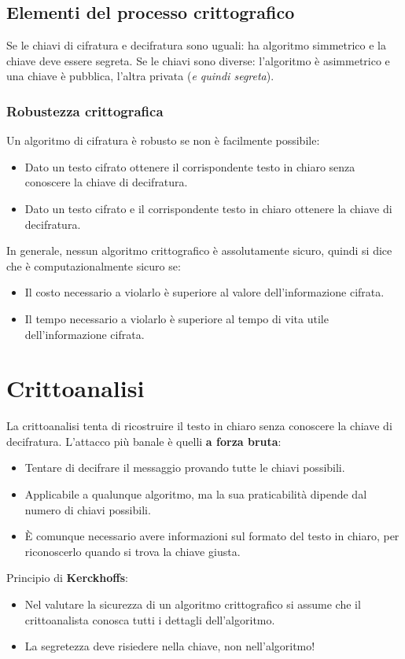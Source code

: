 \documentclass[oneside,a4paper,11pt]{book}
\theoremstyle{italicstyle}
\theoremstyle{normStyle}
\begin{document}
\subsection{Elementi del processo crittografico}
Se le chiavi di cifratura e decifratura sono uguali: ha algoritmo simmetrico e la chiave 
deve essere segreta.
Se le chiavi sono diverse: l'algoritmo è asimmetrico e una chiave è pubblica, l'altra privata 
(\textit{e quindi segreta}).
\subsubsection{Robustezza crittografica}
Un algoritmo di cifratura è robusto se non è facilmente possibile:
\begin{itemize}
  \item Dato un testo cifrato ottenere il corrispondente testo in chiaro senza conoscere la chiave di decifratura.
  \item Dato un testo cifrato e il corrispondente testo in chiaro ottenere la chiave di decifratura.
\end{itemize}
In generale, nessun algoritmo crittografico è assolutamente sicuro, quindi si dice che è computazionalmente sicuro se:
\begin{itemize}
  \item Il costo necessario a violarlo è superiore al valore dell’informazione cifrata.
  \item Il tempo necessario a violarlo è superiore al tempo di vita utile dell’informazione cifrata.
\end{itemize}
\section{Crittoanalisi}
La crittoanalisi tenta di ricostruire il testo in chiaro senza conoscere la chiave di decifratura.
L'attacco più banale è quelli \textbf{a forza bruta}:
\begin{itemize}
  \item Tentare di decifrare il messaggio provando tutte le chiavi possibili. 
  \item Applicabile a qualunque algoritmo, ma la sua praticabilità dipende dal numero di chiavi possibili.
  \item È  comunque necessario avere informazioni sul formato del testo in chiaro, per riconoscerlo quando si trova la chiave giusta.
\end{itemize}
Principio di \textbf{Kerckhoffs}:
\begin{itemize}
  \item Nel valutare la sicurezza di un algoritmo crittografico si assume che il crittoanalista conosca tutti i dettagli dell’algoritmo.
  \item La segretezza deve risiedere nella chiave, non nell’algoritmo! 
\end{itemize}
\end{document}
